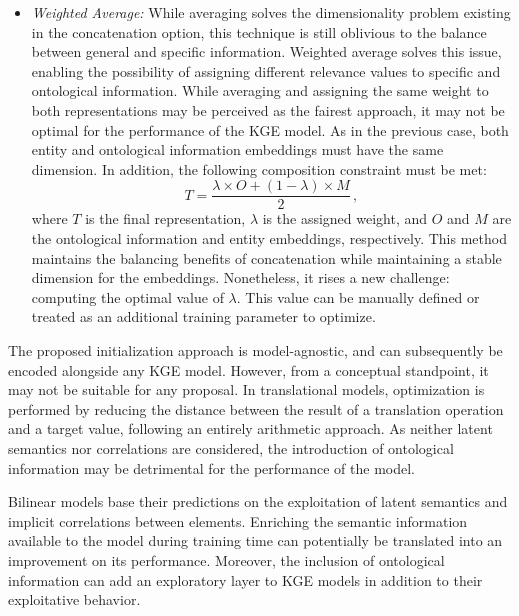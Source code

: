 \begin{itemize}
    \item \textit{Weighted Average:} While averaging solves the dimensionality problem existing in the concatenation option, this technique is still oblivious to the balance between general and specific information. Weighted average solves this issue, enabling the possibility of assigning different relevance values to specific and ontological information. While averaging and assigning the same weight to both representations may be perceived as the fairest approach, it may not be optimal for the performance of the KGE model. As in the previous case, both entity and ontological information embeddings must have the same dimension. In addition, the following composition constraint must be met:
    \begin{equation}
        T = \frac{\lambda \times O + (1 - \lambda) \times M}{2}\,,
    \end{equation}
    where $T$ is the final representation, $\lambda$ is the assigned weight, and $O$ and $M$ are the ontological information and entity embeddings, respectively. This method maintains the balancing benefits of concatenation while maintaining a stable dimension for the embeddings. Nonetheless, it rises a new challenge: computing the optimal value of $\lambda$. This value can be manually defined or treated as an additional training parameter to optimize.
\end{itemize}

The proposed initialization approach is model-agnostic, and can subsequently be encoded alongside any KGE model. However, from a conceptual standpoint, it may not be suitable for any proposal. In translational models, optimization is performed by reducing the distance between the result of a translation operation and a target value, following an entirely arithmetic approach. As neither latent semantics nor correlations are considered, the introduction of ontological information may be detrimental for the performance of the model.

Bilinear models base their predictions on the exploitation of latent semantics and implicit correlations between elements. Enriching the semantic information available to the model during training time can potentially be translated into an improvement on its performance. Moreover, the inclusion of ontological information can add an exploratory layer to KGE models in addition to their exploitative behavior.

